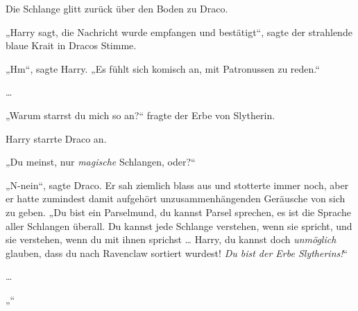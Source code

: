 Die Schlange glitt zurück über den Boden zu Draco.

„Harry sagt, die Nachricht wurde empfangen und bestätigt“, sagte der strahlende blaue Krait in Dracos Stimme.

„Hm“, sagte Harry.
„Es fühlt sich komisch an, mit Patronussen zu reden.“

…

„Warum starrst du mich so an?“ fragte der Erbe von Slytherin.


Harry starrte Draco an.

„Du meinst, nur \emph{magische} Schlangen, oder?“

„N-nein“, sagte Draco. Er sah ziemlich blass aus und stotterte immer noch, aber er hatte zumindest damit aufgehört unzusammenhängenden Geräusche von sich zu geben.
„Du bist ein Parselmund, du kannst Parsel sprechen, es ist die Sprache aller Schlangen überall. Du kannst jede Schlange verstehen, wenn sie spricht, und sie verstehen, wenn du mit ihnen sprichst … Harry, du kannst doch \emph{unmöglich} glauben, dass du nach Ravenclaw sortiert wurdest! \emph{Du bist der Erbe Slytherins!}“

…

„“

